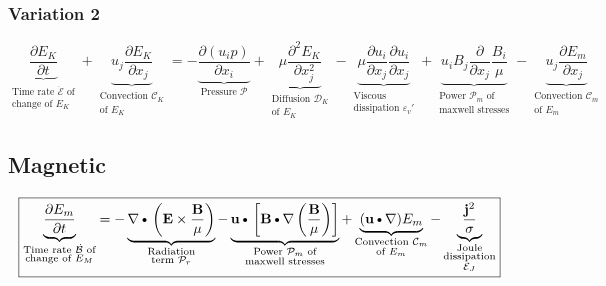 \documentclass[11pt]{article}
\newcommand{\B}{\mathbf{B}}
\newcommand{\MC}{\mathcal}
\newcommand{\PD}{\partial}
\newcommand{\BM}{\frac{\mathbf{B}}{\mu}}
\newcommand{\E}{\mathbf{E}}
\newcommand{\JSS}{\frac{\mathbf{j}^2}{\sigma}}
\renewcommand{\U}{\mathbf{u}}
\newcommand{\DOT}{\text{\textbullet}}
\begin{document}
\subsubsection{Variation 2}
\begin{equation}
	\boxed{
	\underbrace{\frac{\PD E_K}{\PD t}}_{\substack{\text{Time rate $\dot{\MC E}$ of} \\ \text{change of $E_K$}}} +
	\underbrace{u_j \frac{\PD E_K}{\PD x_j}}_
	{\substack{\text{Convection } \MC C_K \\\text{of $E_K$}}}
	=
	- \underbrace{\frac{\PD (u_i p)}{\PD x_i}}_{\text{Pressure } \MC P}
	+ \underbrace{ \mu \frac{\PD^2 E_K}{\PD x_j^2} }_{\substack{\text{Diffusion } \MC D_K \\ \text{of $E_K$ }}}
	- \underbrace{\mu \frac{\PD u_i}{\PD x_j}\frac{\PD u_i}{\PD x_j} }_{\substack{\text{Viscous } \\ \text{dissipation } \varepsilon_v'}}
	+ \underbrace{u_i B_j \frac{\PD}{\PD x_j} \frac{B_i}{\mu}}_
	{\substack{\text{Power $\MC P_{m}$ of}\\\text{maxwell stresses}}}
	- \underbrace{u_j \frac{\PD E_m}{\PD x_j}}_
	{\substack{\text{Convection $\MC C_m$}\\\text{of $E_m$}}}
	}
\end{equation}

\subsection{Magnetic}
\begin{equation}
	\boxed{
	\underbrace{\frac{\PD E_m}{\PD t} }_
	{\substack{\text{Time rate $\dot{\MC B}$ of}\\\text{change of $E_M$}}}
	=
	- \underbrace{\nabla \DOT \left(\E \times \BM \right)}_
	{\substack{\text{Radiation}\\\text{term $\MC P_{r}$}}}
	- \underbrace{\U \DOT \left[\B \DOT \nabla \left( \BM \right) \right]}_
	{\substack{\text{Power $\MC P_{m}$ of}\\\text{maxwell stresses}}}
	+ \underbrace{(\U \DOT \nabla) E_m}_
	{\substack{\text{Convection $\MC C_m$}\\\text{of $E_m$}}}
	- \underbrace{\JSS}_
	{\substack{\text{Joule}\\\text{dissipation}\\\text{$\MC E_J$}}}
	}
\end{equation}
\end{document}
